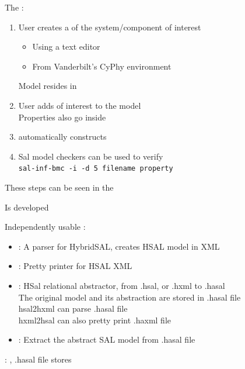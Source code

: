 \documentclass{seminar}
\begin{document}
\begin{slide}

The {}:

\begin{enumerate}
\item
 User creates a {} of the system/component of interest
 \begin{itemize}
 \item Using a text editor
 \item From Vanderbilt's CyPhy environment
 \end{itemize}
 Model resides in {}

\item
 User adds {} of interest  to the model
 \\
 Properties also go inside {}

\item
 {} automatically constructs {}

\item
 Sal model checkers can be used to verify {}
 \\
 {\texttt{sal-inf-bmc -i -d 5 filename property}}
\end{enumerate}

\medskip
These steps can be seen in the {} 

\end{slide}
\begin{slide}

Is developed {}

Independently usable {}:
\begin{itemize}
\item
 {}:  A parser for HybridSAL, creates HSAL model in XML
\item
 {}:  Pretty printer for HSAL XML
\item
 {}:  HSal relational abstractor, from .hsal, or .hxml to .hasal
\\
 The original model and its abstraction are {} stored in .hasal file
\\
 hsal2hxml can parse .hasal file
\\
 hxml2hsal can also pretty print .haxml file
\item
 {}:  Extract the abstract SAL model from .hasal file
\end{itemize}

\medskip
{}: {}, .hasal file stores
 {}

\end{slide}
\end{document}
